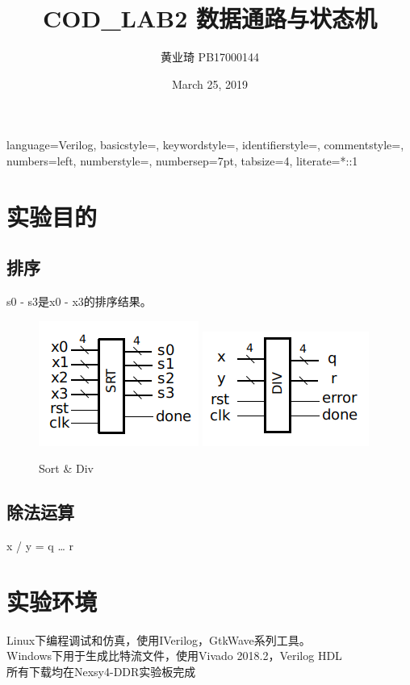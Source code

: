 \documentclass[12pt, a4paper]{article}
\title{COD\_LAB2 数据通路与状态机}
\author{黄业琦 PB17000144}
\date{March 25, 2019}
\begin{document}
\maketitle
\tableofcontents
\clearpage
{}
{
	language=Verilog,
	basicstyle=\small\ttfamily,
	keywordstyle=\color{vblue},
	identifierstyle=\color{black},
	commentstyle=\color{vgreen},
	numbers=left,
	numberstyle=\tiny\color{black},
	numbersep=7pt,
	tabsize=4,
	literate=*{:}{{\textcolor{black}{:}}}1
}
\section{实验目的}
\subsection{排序}
s0 - s3是x0 - x3的排序结果。
\begin{figure}[H]
	\centering
	\includegraphics[width=0.4\linewidth]{sort}
	\includegraphics[width=0.4\linewidth]{div}
	\caption{Sort \& Div}
	\label{Sort}
\end{figure}
\subsection{除法运算}
x / y = q … r
\clearpage

\section{实验环境}
Linux下编程调试和仿真，使用IVerilog，GtkWave系列工具。\\
Windows下用于生成比特流文件，使用Vivado 2018.2，Verilog HDL\\
所有下载均在Nexsy4-DDR实验板完成
\end{document}
